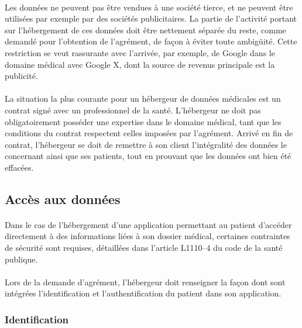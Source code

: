 \paragraph{}
Les données ne peuvent pas être vendues à une société tierce, et ne peuvent
être utilisées par exemple par des sociétés publicitaires. La partie de
l'activité portant sur l'hébergement de ces données doit être nettement séparée
du reste, comme demandé pour l'obtention de l'agrément, de façon à éviter toute
ambigüité. Cette restriction se veut rassurante avec l'arrivée, par exemple, de
Google dans le domaine médical avec Google X, dont la source de revenus
principale est la publicité.

\paragraph{}
La situation la plus courante pour un hébergeur de données médicales est un
contrat signé avec un professionnel de la santé. L'hébergeur ne doit pas
obligatoirement posséder une expertise dans le domaine médical, tant que les
conditions du contrat respectent celles imposées par l'agrément. Arrivé en fin
de contrat, l'hébergeur se doit de remettre à son client l'intégralité des
données le concernant ainsi que ses patients, tout en prouvant que les données
ont bien été effacées.


        \subsection{Accès aux données}

\paragraph{}
Dans le cas de l'hébergement d'une application permettant au patient d'accéder
directement à des informations liées à son dossier médical, certaines
contraintes de sécurité sont requises, détaillées dans l'article L1110--4 du
code de la santé publique.

\paragraph{}
Lors de la demande d'agrément, l'hébergeur doit renseigner la façon dont sont
intégrées l'identification et l'authentification du patient dans son
application.

            \subsubsection{Identification}

